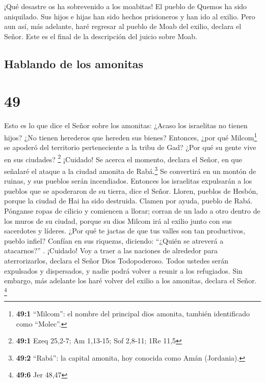  ¡Qué desastre os ha sobrevenido a los moabitas! El
pueblo de Quemos ha sido aniquilado. Sus hijos e hijas han sido hechos
prisioneros y han ido al exilio.  Pero aun así, más
adelante, haré regresar al pueblo de Moab del exilio, declara el Señor.
Este es el final de la descripción del juicio sobre Moab.

\hypertarget{hablando-de-los-amonitas}{%
\subsection{Hablando de los amonitas}\label{hablando-de-los-amonitas}}

\hypertarget{section-48}{%
\section{49}\label{section-48}}

 Esto es lo que dice el Señor sobre los amonitas: ¿Acaso
los israelitas no tienen hijos? ¿No tienen herederos que hereden sus
bienes? Entonces, ¿por qué Milcom\footnote{\textbf{49:1} ``Milcom'': el
  nombre del principal dios amonita, también identificado como
  ``Molec''.} se apoderó del territorio perteneciente a la tribu de Gad?
¿Por qué su gente vive en sus ciudades? \footnote{\textbf{49:1} Ezeq
  25,2-7; Am 1,13-15; Sof 2,8-11; 1Re 11,5}  ¡Cuidado! Se
acerca el momento, declara el Señor, en que señalaré el ataque a la
ciudad amonita de Rabá.\footnote{\textbf{49:2} ``Rabá'': la capital
  amonita, hoy conocida como Amán (Jordania).} Se convertirá en un
montón de ruinas, y sus pueblos serán incendiados. Entonces los
israelitas expulsarán a los pueblos que se apoderaron de su tierra, dice
el Señor.  Lloren, pueblos de Hesbón, porque la ciudad de
Hai ha sido destruida. Clamen por ayuda, pueblo de Rabá. Pónganse ropas
de cilicio y comiencen a llorar; corran de un lado a otro dentro de los
muros de su ciudad, porque su dios Milcom irá al exilio junto con sus
sacerdotes y líderes.  ¿Por qué te jactas de que tus
valles son tan productivos, pueblo infiel? Confían en sus riquezas,
diciendo: ``¿Quién se atreverá a atacarnos?'' .  ¡Cuidado!
Voy a traer a las naciones de alrededor para aterrorizarlos, declara el
Señor Dios Todopoderoso. Todos ustedes serán expulsados y dispersados, y
nadie podrá volver a reunir a los refugiados.  Sin
embargo, más adelante los haré volver del exilio a los amonitas, declara
el Señor. \footnote{\textbf{49:6} Jer 48,47}

